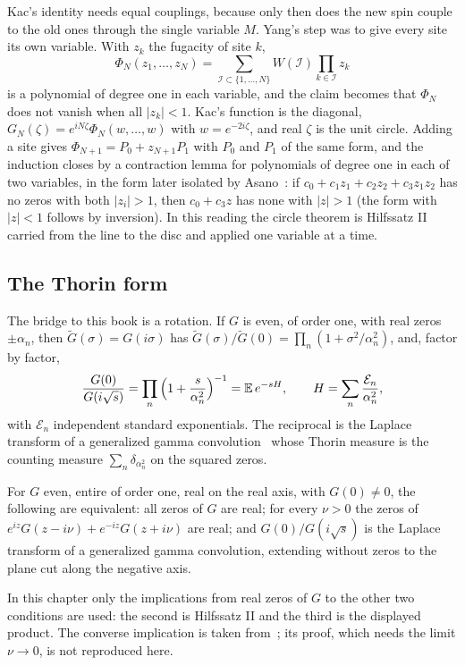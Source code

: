 Kac's identity needs equal couplings, because only then does the new spin couple to the old ones through the single variable $M$. Yang's step was to give every site its own variable. With $z_k$ the fugacity of site $k$,
\[
\Phi_N(z_1,\dots,z_N)=\sum_{\mathcal I\subset\{1,\dots,N\}}W(\mathcal I)\prod_{k\in \mathcal I}z_k
\]
is a polynomial of degree one in each variable, and the claim becomes that $\Phi_N$ does not vanish when all $|z_k|<1$. Kac's function is the diagonal, $G_N(\zeta)=e^{iN\zeta}\Phi_N(w,\dots,w)$ with $w=e^{-2i\zeta}$, and real $\zeta$ is the unit circle. Adding a site gives $\Phi_{N+1}=P_0+z_{N+1}P_1$ with $P_0$ and $P_1$ of the same form, and the induction closes by a contraction lemma for polynomials of degree one in each of two variables, in the form later isolated by Asano~\cite{As70}: if $c_0+c_1z_1+c_2z_2+c_3z_1z_2$ has no zeros with both $|z_i|>1$, then $c_0+c_3z$ has none with $|z|>1$ (the form with $|z|<1$ follows by inversion). In this reading the circle theorem is Hilfssatz II carried from the line to the disc and applied one variable at a time.

\subsection{The Thorin form}

The bridge to this book is a rotation. If $G$ is even, of order one, with real zeros $\pm\alpha_n$, then $\tilde G(\sigma)=G(i\sigma)$ has $\tilde G(\sigma)/\tilde G(0)=\prod_n(1+\sigma^2/\alpha_n^2)$, and, factor by factor,
\[
\frac{G(0)}{G(i\sqrt s)}=\prod_n\Big(1+\frac{s}{\alpha_n^2}\Big)^{-1}=\mathbb{E}\,e^{-sH},\qquad H=\sum_n\frac{\mathcal E_n}{\alpha_n^2},
\]
with $\mathcal E_n$ independent standard exponentials. The reciprocal is the Laplace transform of a generalized gamma convolution~\cite{Th77,Bo92} whose Thorin measure is the counting measure $\sum_n\delta_{\alpha_n^2}$ on the squared zeros.

\begin{theorem}\label{thm:frullani}
For $G$ even, entire of order one, real on the real axis, with $G(0)\ne0$, the following are equivalent: all zeros of $G$ are real; for every $\nu>0$ the zeros of $e^{iz}G(z-i\nu)+e^{-iz}G(z+i\nu)$ are real; and $G(0)/G(i\sqrt s)$ is the Laplace transform of a generalized gamma convolution, extending without zeros to the plane cut along the negative axis.
\end{theorem}

In this chapter only the implications from real zeros of $G$ to the other two conditions are used: the second is Hilfssatz II and the third is the displayed product. The converse implication is taken from~\cite{Po26b}; its proof, which needs the limit $\nu\to0$, is not reproduced here.

